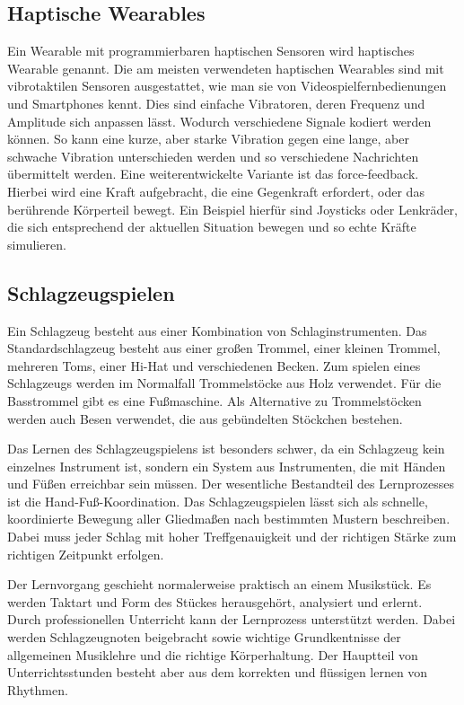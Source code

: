 \documentclass[ngerman,runningheads,a4paper]{llncs}
\begin{document}
\subsection{Haptische Wearables}
Ein Wearable mit programmierbaren haptischen Sensoren wird haptisches Wearable genannt.
Die am meisten verwendeten haptischen Wearables sind mit vibrotaktilen Sensoren ausgestattet, wie man sie von Videospielfernbedienungen und Smartphones kennt. Dies sind einfache Vibratoren, deren Frequenz und Amplitude sich anpassen lässt.
Wodurch verschiedene Signale kodiert werden können. So kann eine kurze, aber starke Vibration gegen eine lange, aber schwache Vibration unterschieden werden und so verschiedene Nachrichten übermittelt werden.
Eine weiterentwickelte Variante ist das force-feedback. Hierbei wird eine Kraft aufgebracht, die eine Gegenkraft erfordert, oder das berührende Körperteil bewegt. Ein Beispiel hierfür sind Joysticks oder Lenkräder, die sich entsprechend der aktuellen Situation bewegen und so echte Kräfte simulieren.\cite{bennett2004hap}

\subsection{Schlagzeugspielen}
Ein Schlagzeug besteht aus einer Kombination von Schlaginstrumenten. Das Standardschlagzeug besteht aus einer großen Trommel, einer kleinen Trommel, mehreren Toms, einer Hi-Hat und verschiedenen Becken. Zum spielen eines Schlagzeugs werden im Normalfall Trommelstöcke aus Holz verwendet. Für die Basstrommel gibt es eine Fußmaschine. Als Alternative zu Trommelstöcken werden auch Besen verwendet, die aus gebündelten Stöckchen bestehen.

Das Lernen des Schlagzeugspielens ist besonders schwer, da ein Schlagzeug kein einzelnes Instrument ist, sondern ein System aus Instrumenten, die mit Händen und Füßen erreichbar sein müssen. Der wesentliche Bestandteil des Lernprozesses ist die Hand-Fuß-Koordination.\cite{bouwer2011haptic}
Das Schlagzeugspielen lässt sich als schnelle, koordinierte Bewegung aller Gliedmaßen nach bestimmten Mustern beschreiben.
Dabei muss jeder Schlag mit hoher Treffgenauigkeit und der richtigen Stärke zum richtigen Zeitpunkt erfolgen.\cite{6775447}

Der Lernvorgang geschieht normalerweise praktisch an einem Musikstück. Es werden Taktart und Form des Stückes herausgehört, analysiert und erlernt.
Durch professionellen Unterricht kann der Lernprozess unterstützt werden.
Dabei werden Schlagzeugnoten beigebracht sowie wichtige Grundkentnisse der allgemeinen Musiklehre und die richtige Körperhaltung.
Der Hauptteil von Unterrichtsstunden besteht aber aus dem korrekten und flüssigen lernen von Rhythmen.\cite{6775447}
\end{document}
